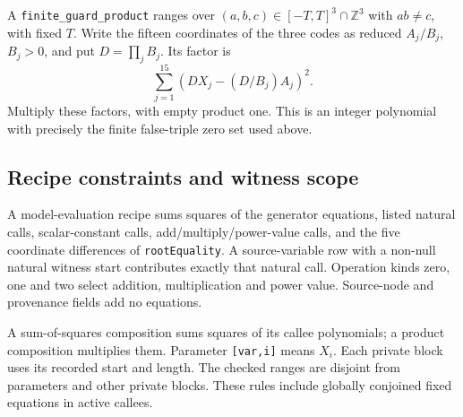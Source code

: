 \documentclass[11pt]{article}
\theoremstyle{definition}
\theoremstyle{remark}
\newcommand{\Z}{\mathbb Z}
\begin{document}
A \texttt{finite\_guard\_product} ranges over
$(a,b,c)\in[-T,T]^3\cap\Z^3$ with $ab\ne c$, with fixed $T$.
Write the fifteen coordinates of the three codes as reduced
$A_j/B_j$, $B_j>0$, and put $D=\prod_jB_j$. Its factor is
\[
                 \sum_{j=1}^{15}(DX_j-(D/B_j)A_j)^2.
\]
Multiply these factors, with empty product one. This is an integer
polynomial with precisely the finite false-triple zero set used above.

\subsection{Recipe constraints and witness scope}
A model-evaluation recipe sums squares of the generator equations,
listed natural calls, scalar-constant calls, add/multiply/power-value calls,
and the five coordinate differences of \texttt{rootEquality}.
A source-variable row with a non-null natural witness start contributes
exactly that natural call. Operation kinds zero, one and two select
addition, multiplication and power value. Source-node and provenance
fields add no equations.

A sum-of-squares composition sums squares of its callee polynomials;
a product composition multiplies them. Parameter \texttt{[var,i]} means
$X_i$. Each private block uses its recorded start and length.
The checked ranges are disjoint from parameters and other private blocks.
These rules include globally conjoined fixed equations in active callees.
\end{document}
